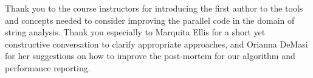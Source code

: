 \documentclass[10pt]{article}
\begin{document}
Thank you to the course instructors for introducing the first author to the tools and concepts
needed to consider improving the parallel code in the domain of string analysis.
Thank you especially to Marquita Ellis for a short yet constructive conversation to clarify
appropriate approaches, and Orianna DeMasi for her suggestions on how to improve the post-mortem
for our algorithm and performance reporting.

\printbibliography{}
\end{document}

